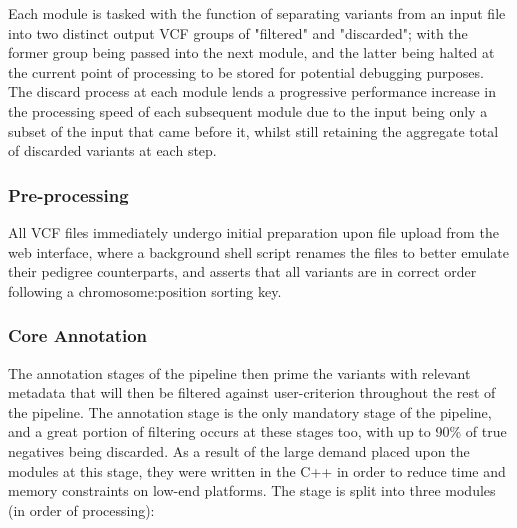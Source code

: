 \documentclass{bioinfo}
\begin{document}
\begin{methods}
Each module is tasked with the function of separating variants from an input file into two distinct output VCF groups of "filtered" and "discarded"; with the former group being passed into the next module, and the latter being halted at the current point of processing to be stored for potential debugging purposes. The discard process at each module lends a progressive performance increase in the processing speed of each subsequent module due to the input being only a subset of the input that came before it, whilst still retaining the aggregate total of discarded variants at each step.

\subsubsection{Pre-processing}

All VCF files immediately undergo initial preparation upon file upload from the web interface, where a background shell script renames the files to better emulate their pedigree counterparts, and asserts that all variants are in correct order following a chromosome:position sorting key.


\subsubsection{Core Annotation}

The annotation stages of the pipeline then prime the variants with relevant metadata that will then be filtered against user-criterion throughout the rest of the pipeline. The annotation stage is the only mandatory stage of the pipeline, and a great portion of filtering occurs at these stages too, with up to 90\% of true negatives being discarded. As a result of the large demand placed upon the modules at this stage, they were written in the C++ in order to reduce time and memory constraints on low-end platforms. The stage is split into three modules (in order of processing): 

\begin{itemize}


\end{itemize}
\end{methods}
\end{document}
